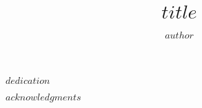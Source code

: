 \documentclass[twoside,12pt,final]{ucthesis-CA2012}
\begin{document}
\begin{ucfrontmatter}


  \title{$title$}
  \author{$author$}

   
  
	\maketitle
	
	\copyrightpage


    \begin{dedication}

      \vspace*{20ex}

      \begin{center}
      \begin{large}

        $dedication$

      \end{large}

      \end{center}

  \end{dedication}
  
  
\begin{acknowledgements}
    $acknowledgments$
  \end{acknowledgements}


\end{ucfrontmatter}
\end{document}
